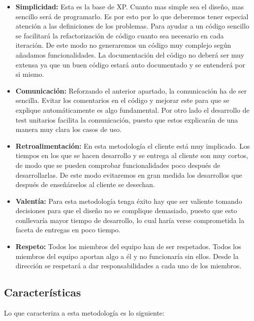 \begin{itemize}
  \item \textbf{Simplicidad:} Esta es la base de \acs{XP}. Cuanto mas simple sea el diseño, mas sencillo será de programarlo. Es por esto
    por lo que deberemos tener especial atención a las definiciones de los problemas. Para ayudar a un código sencillo se facilitará
    la refactorización de código cuanto sea necesario en cada iteración. De este modo no generaremos un código muy complejo según
    añadamos funcionalidades. La documentación del código no deberá ser muy extensa ya que un buen código estará auto documentado
    y se entenderá por si mismo.
  \item \textbf{Comunicación:} Reforzando el anterior apartado, la comunicación ha de ser sencilla. Evitar los comentarios
    en el código y mejorar este para que se explique automáticamente es algo fundamental. Por otro lado el desarrollo
    de test unitarios facilita la comunicación, puesto que estos explicarán de una manera muy clara los casos de uso.
  \item \textbf{Retroalimentación:} En esta metodología el cliente está muy implicado. Los tiempos en los que se hacen
    desarrollo y se entrega al cliente son muy cortos, de modo que se pueden comprobar funcionalidades poco después
    de desarrollarlas. De este modo evitaremos en gran medida los desarrollos que después de enseñárselos al cliente se desechan.
  \item \textbf{Valentía:} Para esta metodología tenga éxito hay que ser valiente tomando decisiones para que el diseño no se complique
    demasiado, puesto que esto conllevaría mayor tiempo de desarrollo, lo cual haría verse comprometida la faceta de entregas
    en poco tiempo.
  \item \textbf{Respeto:} Todos los miembros del equipo han de ser respetados. Todos los miembros del equipo aportan
    algo a él y no funcionaría sin ellos. Desde la dirección se respetará a dar responsabilidades a cada uno de los miembros.
\end{itemize}

\subsection{Características}

Lo que caracteriza a esta metodología es lo siguiente:

